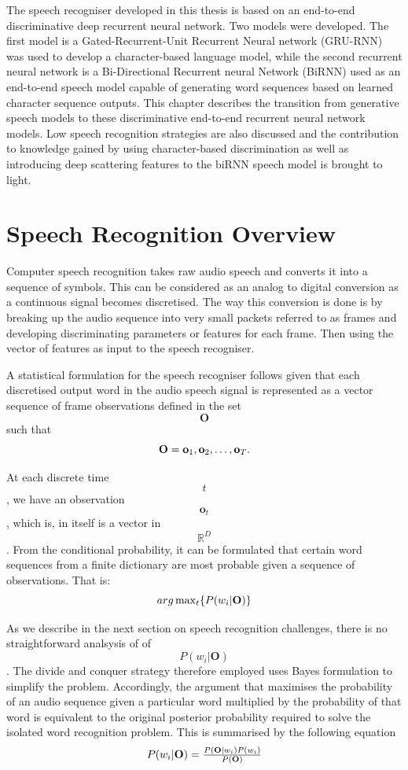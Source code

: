 The speech recogniser developed in this thesis is based on an end-to-end discriminative deep recurrent neural network.  Two models were developed.  The first model is a Gated-Recurrent-Unit Recurrent Neural network (GRU-RNN) was used to develop a character-based language model, while the second recurrent neural network is a Bi-Directional Recurrent neural Network (BiRNN) used as an end-to-end speech model capable of generating word sequences based on learned character sequence outputs.  This chapter describes the transition from generative speech models to these discriminative end-to-end recurrent neural network models.  Low speech recognition strategies are also discussed and the contribution to knowledge gained by using character-based discrimination as well as introducing deep scattering features to the biRNN speech model is brought to light.

\section{Speech Recognition Overview}
Computer speech recognition takes raw audio speech and converts it into a sequence of symbols.  This can be considered as an analog to digital conversion as a continuous signal becomes discretised.  The way this conversion is done is by breaking up the audio sequence into very small packets referred to as frames and developing discriminating parameters or features for each frame. Then using the vector of features as input to the speech recogniser.  

A statistical formulation \citep{young2002htk} for the speech recogniser follows given that each discretised output word in the audio speech signal is represented as a vector sequence of frame observations defined in the set $$\mathbf{O}$$ such that 
\begin{equation}$$\mathbf{O}=\mathbf{o}_1,\mathbf{o}_2,\dots,\mathbf{o}_T$$.
\label{eqn_1_1_sr_inputs}\end{equation}

At each discrete time $$t$$, we have an observation $$\mathbf{o}_t$$, which is, in itself is a vector in $$\mathbb{R}^D$$.  From the conditional probability, it can be formulated that certain word sequences from a finite dictionary are most probable given a sequence of observations. That is:
\begin{equation}$$arg\max_t\{P(w_i|\mathbf{O})\}$$
\label{eqn_2_2_srgen}
\end{equation}

As we describe in the next section on speech recognition challenges, there is no straightforward analsysis of of $$P(w_i|\mathbf{O})$$.  The divide and conquer strategy therefore employed uses Bayes formulation to simplify the problem.  Accordingly, the argument that maximises the probability of an audio sequence given a particular word multiplied by the probability of that word is equivalent to the original posterior probability required to solve the isolated word recognition problem. This is summarised by the following equation
\begin{equation}$$P(w_i|\mathbf{O})=\frac{P(\mathbf{O}|w_i)P(w_i)}{P(\mathbf{O})}$$
\label{eqn_2_3_bayes_sr}
\end{equation}

